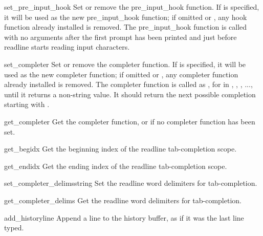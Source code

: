\begin{funcdesc}{set_pre_input_hook}{}
Set or remove the pre_input_hook function.  If  is specified,
it will be used as the new pre_input_hook function; if omitted or
, any hook function already installed is removed.  The
pre_input_hook function is called with no arguments after the first prompt
has been printed and just before readline starts reading input characters.
\end{funcdesc}

\begin{funcdesc}{set_completer}{}
Set or remove the completer function.  If  is specified,
it will be used as the new completer function; if omitted or
, any completer function already installed is removed.  The
completer function is called as , for  in , , , ...,
until it returns a non-string value.  It should return the next
possible completion starting with .
\end{funcdesc}

\begin{funcdesc}{get_completer}{}
Get the completer function, or  if no completer function
has been set.  
\end{funcdesc}

\begin{funcdesc}{get_begidx}{}
Get the beginning index of the readline tab-completion scope.
\end{funcdesc}

\begin{funcdesc}{get_endidx}{}
Get the ending index of the readline tab-completion scope.
\end{funcdesc}

\begin{funcdesc}{set_completer_delims}{string}
Set the readline word delimiters for tab-completion.
\end{funcdesc}

\begin{funcdesc}{get_completer_delims}{}
Get the readline word delimiters for tab-completion.
\end{funcdesc}

\begin{funcdesc}{add_history}{line}
Append a line to the history buffer, as if it was the last line typed.
\end{funcdesc}

